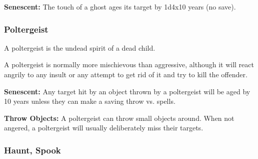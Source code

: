 \begin{multicols*}{2}
\textbf{Senescent:} The touch of a ghost ages its target by 1d4x10 years (no save).

\subsubsection{Poltergeist}

A poltergeist is the undead spirit of a dead child.

A poltergeist is normally more mischievous than aggressive, although it will react angrily to any insult or any attempt to get rid of it and try to kill the offender.

\textbf{Senescent:} Any target hit by an object thrown by a poltergeist will be aged by 10 years unless they can make a saving throw vs. spells.

\textbf{Throw Objects:} A poltergeist can throw small objects around. When not angered, a poltergeist will usually deliberately miss their targets.

\subsubsection{Haunt, Spook}
\end{multicols*}
